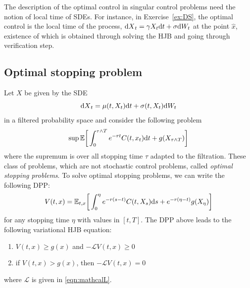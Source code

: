 \documentclass[11pt]{book}
\newcommand{\dt}{\text{\normalfont d}t}
\newcommand{\ds}{\text{\normalfont d}s}
\newcommand{\dX}{\text{\normalfont d}X}
\newcommand{\dW}{\text{\normalfont d}W}
\begin{document}
The description of the optimal control in singular control problems need the notion of local time of SDEs. For instance, in Exercise~\ref{ex:DS}, the optimal control is the local time of the process, ${\dX}_t=\gamma X_t{{\dt}}+\sigma \dW_t$ at the point $\hat{x}$, existence of which is obtained through solving the HJB and going through verification step. 
\subsection{Optimal stopping problem}
Let $X$ be given by the SDE
\begin{equation}
    {\dX}_t = \mu(t,X_t){\dt}+\sigma(t,X_t)\dW_t
\end{equation}
in a filtered probability space
and consider the following problem
\begin{equation}
    \sup_{}\mathbb{E}\bigg[\int_0^{\tau\wedge T} e^{-rt} C(t,x_t){\dt} + g(X_{\tau\wedge T})\bigg]
\end{equation}
where the supremum is over all stopping time $\tau$ adapted to the filtration. These class of problems, which are not stochastic control problems,  called \emph{optimal stopping problems}. To solve optimal stopping problems, we can write the following DPP:
\begin{equation}
    V(t,x)=\mathbb{E}_{t,x}\bigg[\int_0^{\eta}e^{-r(s-t)}C(t,X_s){\ds}+e^{-r(\eta-t)}g(X_\eta)\bigg]
\end{equation}
for any stopping time $\eta$ with values in $[t,T]$. 
The DPP above leads to the following variational HJB equation:
\begin{enumerate}
    \item $V(t,x)\ge g(x)$ and $-\mathcal{L}V(t,x)\ge0$
    \item if $V(t,x)> g(x)$, then $-\mathcal{L}V(t,x)=0$
\end{enumerate}
where $\mathcal{L}$ is given in \eqref{eqn:mathcalL}.




\end{document}
